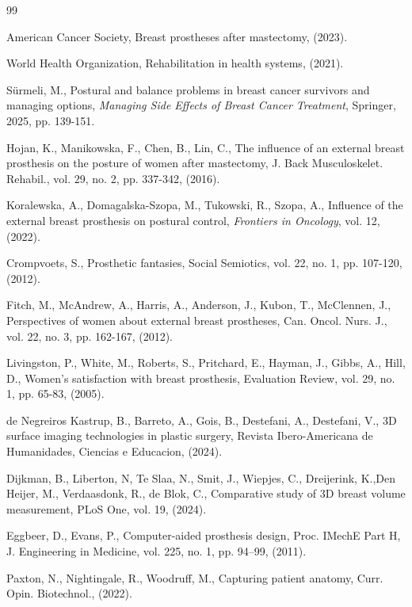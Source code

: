 \documentclass{article}
\begin{document}
	\begin{thebibliography}{99}
		
			
	 American Cancer Society, Breast prostheses after mastectomy, (2023).

 World Health Organization, Rehabilitation in health systems, (2021).

 Sürmeli, M., Postural and balance problems in breast cancer survivors and managing options, \textit{Managing Side Effects of Breast Cancer Treatment}, Springer, 2025, pp. 139-151.

 Hojan, K., Manikowska, F., Chen, B., Lin, C., The influence of an external breast prosthesis on the posture of women after mastectomy, J. Back Musculoskelet. Rehabil., vol. 29, no. 2, pp. 337-342, (2016).

 Koralewska, A., Domagalska-Szopa, M., Tukowski, R., Szopa, A., Influence of the external breast prosthesis on postural control, \textit{Frontiers in Oncology}, vol. 12, (2022).

 Crompvoets, S., Prosthetic fantasies, Social Semiotics, vol. 22, no. 1, pp. 107-120, (2012).

 Fitch, M., McAndrew, A., Harris, A., Anderson, J., Kubon, T., McClennen, J., Perspectives of women about external breast prostheses, Can. Oncol. Nurs. J., vol. 22, no. 3, pp. 162-167, (2012).

 Livingston, P., White, M., Roberts, S., Pritchard, E., Hayman, J., Gibbs, A., Hill, D., Women’s satisfaction with breast prosthesis, Evaluation Review, vol. 29, no. 1, pp. 65-83, (2005).

 de Negreiros Kastrup, B., Barreto, A., Gois, B., Destefani, A., Destefani, V., 3D surface imaging technologies in plastic surgery, Revista Ibero-Americana de Humanidades, Ciencias e Educacion, (2024).

 Dijkman, B., Liberton, N, Te Slaa, N., Smit, J., Wiepjes, C., Dreijerink, K.,Den Heijer, M., Verdaasdonk, R., de Blok, C., Comparative study of 3D breast volume measurement, PLoS One, vol. 19, (2024).

 Eggbeer, D., Evans, P., Computer-aided prosthesis design, Proc. IMechE Part H, J. Engineering in Medicine, vol. 225, no. 1, pp. 94–99, (2011).

 Paxton, N., Nightingale, R., Woodruff, M., Capturing patient anatomy, Curr. Opin. Biotechnol., (2022).


\end{thebibliography}
\end{document}

